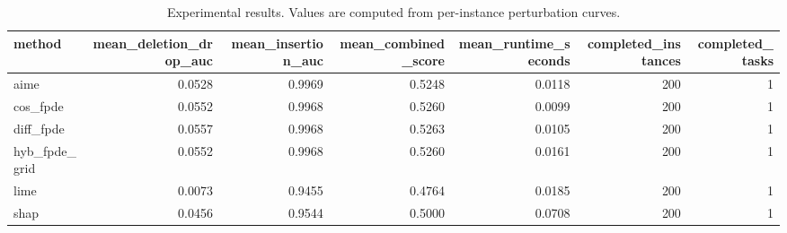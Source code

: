 \begin{table}[t]
\caption{Experimental results. Values are computed from per-instance perturbation curves.}
\label{tab:main_results_computed}
\centering
\begin{tabular}{lrrrrrr}
\toprule
method & mean\_deletion\_drop\_auc & mean\_insertion\_auc & mean\_combined\_score & mean\_runtime\_seconds & completed\_instances & completed\_tasks \\
\midrule
aime & 0.0528 & 0.9969 & 0.5248 & 0.0118 & 200 & 1 \\
cos\_fpde & 0.0552 & 0.9968 & 0.5260 & 0.0099 & 200 & 1 \\
diff\_fpde & 0.0557 & 0.9968 & 0.5263 & 0.0105 & 200 & 1 \\
hyb\_fpde\_grid & 0.0552 & 0.9968 & 0.5260 & 0.0161 & 200 & 1 \\
lime & 0.0073 & 0.9455 & 0.4764 & 0.0185 & 200 & 1 \\
shap & 0.0456 & 0.9544 & 0.5000 & 0.0708 & 200 & 1 \\
\bottomrule
\end{tabular}

\end{table}
